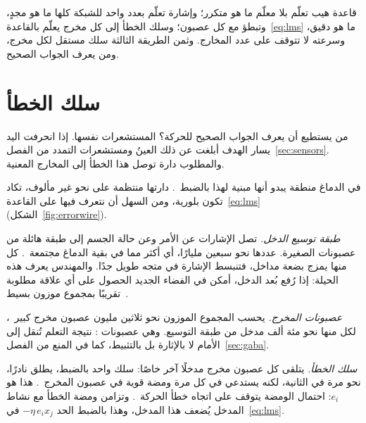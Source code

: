 \begin{keyblock}
\begin{proposition}
\label{prop:teachers}
قاعدة هيب تعلّم بلا معلّم ما هو متكرر؛ وإشارة  تعلّم بعدد واحد للشبكة كلها ما هو مجدٍ، وتبطؤ مع كل عصبون؛ وسلك الخطأ إلى كل مخرج يعلّم بالقاعدة~\eqref{eq:lms} ما هو دقيق، وسرعته لا تتوقف على عدد المخارج. وثمن الطريقة الثالثة سلك مستقل لكل مخرج، ومن يعرف الجواب الصحيح.
\end{proposition}
\end{keyblock}

\section{سلك الخطأ}

من يستطيع أن يعرف الجواب الصحيح للحركة؟ المستشعرات نفسها. إذا انحرفت اليد يسار الهدف أبلغت عن ذلك العينُ ومستشعرات التمدد من الفصل~\ref{sec:sensors}. والمطلوب دارة توصل هذا الخطأ إلى المخارج المعنية.

في الدماغ منطقة يبدو أنها مبنية لهذا بالضبط~\cite{Marr1969,Albus1971}. دارتها منتظمة على نحو غير مألوف، تكاد تكون بلورية، ومن السهل أن نتعرف فيها على القاعدة~\eqref{eq:lms} (الشكل~\ref{fig:errorwire}).

\emph{طبقة توسيع الدخل.} تصل الإشارات عن الأمر وعن حالة الجسم إلى طبقة هائلة من عصبونات  الصغيرة. عددها نحو سبعين مليارًا، أي أكثر مما في بقية الدماغ مجتمعة~\cite{Azevedo2009}. كل منها يمزج بضعة مداخل، فتنبسط الإشارة في متجه طويل جدًا. والمهندس يعرف هذه الحيلة: إذا رُفع بُعد الدخل، أمكن في الفضاء الجديد الحصول على أي علاقة مطلوبة تقريبًا بمجموع موزون بسيط~\cite{Cover1965}.

\emph{عصبونات المخرج.} يحسب المجموع الموزون نحو ثلاثين مليون عصبون مخرج كبير~\cite{Andersen1992cereb}، لكل منها نحو مئة ألف مدخل من طبقة التوسيع. وهي عصبونات : نتيجة التعلم تُنقل إلى الأمام لا بالإثارة بل بالتثبيط، كما في المنع من الفصل~\ref{sec:gaba}.

\emph{سلك الخطأ.} يتلقى كل عصبون مخرج مدخلًا آخر خاصًا: سلك  واحد بالضبط، يطلق نادرًا، نحو مرة في الثانية، لكنه يستدعي في كل مرة ومضة قوية في عصبون المخرج~\cite{Ito2001}. هذا هو $e_i$: احتمال الومضة يتوقف على اتجاه خطأ الحركة~\cite{Herzfeld2018}. وتزامن ومضة الخطأ مع نشاط المدخل يُضعف هذا المدخل، وهذا بالضبط الحد $-\eta\,e_i x_j$ في~\eqref{eq:lms}.

